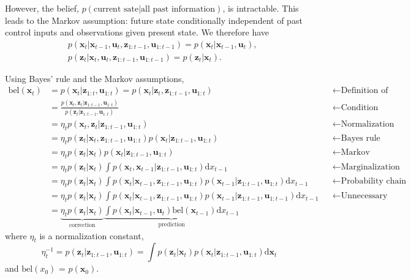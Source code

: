 \documentclass[../Bayesian_Inference.tex]{subfiles}
\begin{document}
However, the belief, $p(\text{current sate} | \text{all past information})$, is intractable. This leads to the Markov assumption: future state conditionally independent of past control inputs and observations given present state. We therefore have
\[
    \begin{aligned}
        & p(\bm{x}_t | \bm{x}_{t-1}, \bm{u}_t, \bm{z}_{1:t-1}, \bm{u}_{1:t-1}) = p(\bm{x}_t | \bm{x}_{t-1}, \bm{u}_t), \\
        & p(\bm{z}_t | \bm{x}_{t}, \bm{u}_t, \bm{z}_{1:t-1}, \bm{u}_{1:t-1}) = p(\bm{z}_t | \bm{x}_{t}).
    \end{aligned}
\]

Using Bayes' rule and the Markov assumptions,
\[
    \begin{aligned}
        \mathrm{bel}(\bm{x}_t) & = p(\bm{x}_t | \bm{z}_{1:t}, \bm{u}_{1:t}) = p(\bm{x}_t | \bm{z}_t, \bm{z}_{1:t-1}, \bm{u}_{1:t}) && \leftarrow \text{Definition of belief} \\
        & = \frac{p(\bm{x}_t, \bm{z}_t |\bm{z}_{1:t-1}, \bm{u}_{1:t})}{p(\bm{z}_t | \bm{z}_{1:t-1},\bm{u}_{1:t})} && \leftarrow \text{Condition probability} \\
        & = \eta_t p(\bm{x}_t, \bm{z}_t | \bm{z}_{1:t-1}, \bm{u}_{1:t}) && \leftarrow \text{Normalization constant}\\
        & = \eta_t p(\bm{z}_t | \bm{x}_t, \bm{z}_{1:t-1}, \bm{u}_{1:t}) p(\bm{x}_t | \bm{z}_{1:t-1}, \bm{u}_{1:t}) && \leftarrow \text{Bayes rule}  \\
        & = \eta_t p(\bm{z}_t | \bm{x}_t) p(\bm{x}_t |\bm{z}_{1:t-1}, \bm{u}_{1:t}) && \leftarrow \text{Markov assumption}  \\
        & = \eta_t p(\bm{z}_t | \bm{x}_t) \int p(\bm{x}_t, \bm{x}_{t-1} | \bm{z}_{1:t-1}, \bm{u}_{1:t}) \mathrm{d} x_{t-1} && \leftarrow \text{Marginalization} \\
        & = \eta_t p(\bm{z}_t | \bm{x}_t) \int p(\bm{x}_t  | \bm{x}_{t-1}, \bm{z}_{1:t-1}, \bm{u}_{1:t}) p (\bm{x}_{t-1} | \bm{z}_{1:t-1}, \bm{u}_{1:t}) \mathrm{d} x_{t-1} && \leftarrow \text{Probability chain rule} \\
        & = \eta_t p(\bm{z}_t | \bm{x}_t) \int p(\bm{x}_t  | \bm{x}_{t-1}, \bm{z}_{1:t-1}, \bm{u}_{1:t}) p (\bm{x}_{t-1} | \bm{z}_{1:t-1}, \bm{u}_{1:t-1}) \mathrm{d} x_{t-1} && \leftarrow \text{Unnecessary condition} \\
        & = \underbrace{\eta_t p(\bm{z}_t | \bm{x}_t)}_{\text{correction}}  \underbrace{\int p(\bm{x}_t  | \bm{x}_{t-1}, \bm{u}_t) \mathrm{bel}(\bm{x}_{t-1}) \mathrm{d} x_{t-1}}_{\text{prediction}}
    \end{aligned} 
\]
where $\eta_t$ is a normalization constant,
\[
    \eta_t^{-1} = p(\bm{z}_t | \bm{z}_{1:t-1}, \bm{u}_{1:t}) = \int p(\bm{z}_t | \bm{x}_{t}) p(\bm{x}_{t} | \bm{z}_{1:t-1}, \bm{u}_{1:t}) \mathrm{d} \bm{x}_t
\]
and $\mathrm{bel}(x_0)$ = $p(\bm{x}_0)$.
\end{document}
